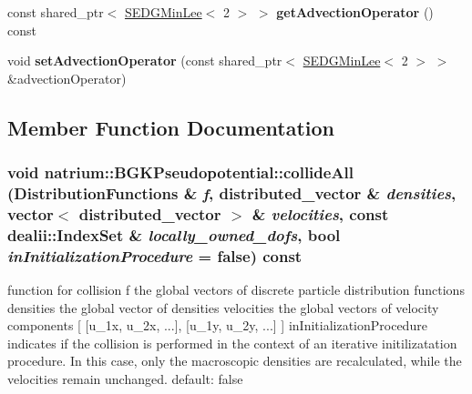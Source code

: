 \begin{DoxyCompactItemize}
\item 
\hypertarget{classnatrium_1_1BGKPseudopotential_ab326d9268e46a37af8d0e5ffaaa3efc9}{
const shared\_\-ptr$<$ \hyperlink{classnatrium_1_1SEDGMinLee}{SEDGMinLee}$<$ 2 $>$ $>$ {\bfseries getAdvectionOperator} () const }
\label{classnatrium_1_1BGKPseudopotential_ab326d9268e46a37af8d0e5ffaaa3efc9}

\item 
\hypertarget{classnatrium_1_1BGKPseudopotential_a737f9bbffc442233a0be88caf584c088}{
void {\bfseries setAdvectionOperator} (const shared\_\-ptr$<$ \hyperlink{classnatrium_1_1SEDGMinLee}{SEDGMinLee}$<$ 2 $>$ $>$ \&advectionOperator)}
\label{classnatrium_1_1BGKPseudopotential_a737f9bbffc442233a0be88caf584c088}

\end{DoxyCompactItemize}


\subsection{Member Function Documentation}
\hypertarget{classnatrium_1_1BGKPseudopotential_a5f40f5076273f9ec38f3078c891b453c}{
\subsubsection[{collideAll}]{\setlength{\rightskip}{0pt plus 5cm}void natrium::BGKPseudopotential::collideAll ({\bf DistributionFunctions} \& {\em f}, \/  distributed\_\-vector \& {\em densities}, \/  vector$<$ distributed\_\-vector $>$ \& {\em velocities}, \/  const dealii::IndexSet \& {\em locally\_\-owned\_\-dofs}, \/  bool {\em inInitializationProcedure} = {\ttfamily false}) const}}
\label{classnatrium_1_1BGKPseudopotential_a5f40f5076273f9ec38f3078c891b453c}


function for collision f the global vectors of discrete particle distribution functions densities the global vector of densities velocities the global vectors of velocity components \mbox{[} \mbox{[}u\_\-1x, u\_\-2x, ...\mbox{]}, \mbox{[}u\_\-1y, u\_\-2y, ...\mbox{]} \mbox{]} inInitializationProcedure indicates if the collision is performed in the context of an iterative initilizatation procedure. In this case, only the macroscopic densities are recalculated, while the velocities remain unchanged. default: false 

